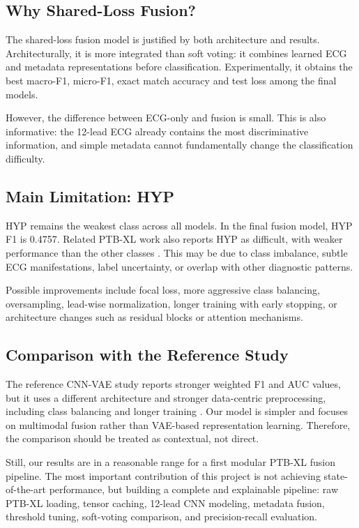 \documentclass[11pt,a4paper]{article}
\begin{document}
\subsection{Why Shared-Loss Fusion?}

The shared-loss fusion model is justified by both architecture and results. Architecturally, it is more integrated than soft voting: it combines learned ECG and metadata representations before classification. Experimentally, it obtains the best macro-F1, micro-F1, exact match accuracy and test loss among the final models.

However, the difference between ECG-only and fusion is small. This is also informative: the 12-lead ECG already contains the most discriminative information, and simple metadata cannot fundamentally change the classification difficulty.

\subsection{Main Limitation: HYP}

HYP remains the weakest class across all models. In the final fusion model, HYP F1 is 0.4757. Related PTB-XL work also reports HYP as difficult, with weaker performance than the other classes \cite{mehdi2026ptbxl}. This may be due to class imbalance, subtle ECG manifestations, label uncertainty, or overlap with other diagnostic patterns.

Possible improvements include focal loss, more aggressive class balancing, oversampling, lead-wise normalization, longer training with early stopping, or architecture changes such as residual blocks or attention mechanisms.

\subsection{Comparison with the Reference Study}

The reference CNN-VAE study reports stronger weighted F1 and AUC values, but it uses a different architecture and stronger data-centric preprocessing, including class balancing and longer training \cite{mehdi2026ptbxl}. Our model is simpler and focuses on multimodal fusion rather than VAE-based representation learning. Therefore, the comparison should be treated as contextual, not direct.

Still, our results are in a reasonable range for a first modular PTB-XL fusion pipeline. The most important contribution of this project is not achieving state-of-the-art performance, but building a complete and explainable pipeline: raw PTB-XL loading, tensor caching, 12-lead CNN modeling, metadata fusion, threshold tuning, soft-voting comparison, and precision-recall evaluation.
\end{document}
